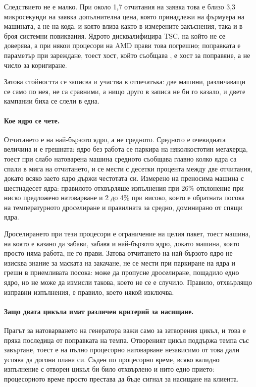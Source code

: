 Следствието не е малко. При около 1,7 отчитания на заявка това е близо 3,3 микросекунди на
заявка допълнителна цена, която принадлежи на фърмуера на машината, а не на кода, и която
влиза както в измерените закъснения, така и в броя системни повиквания. Ядрото дисквалифицира
TSC, на който не се доверява, а при някои процесори на AMD прави това погрешно; поправката е
параметър при зареждане, тоест хост, който съобщава , е хост за поправяне, а не
число за коригиране.

Затова стойността се записва и участва в отпечатъка: две машини, различаващи се само по нея,
не са сравними, а нищо друго в записа не би го казало, и двете кампании биха се слели в една.

\paragraph{Кое ядро се чете.} Отчитането е на най-бързото ядро, а не средното.
Средното е очевидната величина и е грешната: ядро без работа се паркира на няколкостотин
мегахерца, тоест при слабо натоварена машина средното съобщава главно колко ядра са спали в
мига на отчитането, и се мести с десетки процента между две отчитания, докато всяко заето
ядро държи честотата си. Измерено на преносима машина с шестнадесет ядра: правилото
отхвърляше изпълнения при 26\% отклонение при ниско предложено натоварване и 2 до 4\% при
високо, което е обратната посока на температурното дроселиране и правилната за средно,
доминирано от спящи ядра.

Дроселирането при тези процесори е ограничение на целия пакет, тоест машина, на която е
казано да забави, забавя и най-бързото ядро, докато машина, която просто няма работа, не го
прави. Затова отчитането на най-бързото ядро не изисква знание за маската на закачане, не
се мести при паркиране на ядра и греши в приемливата посока: може да пропусне дроселиране,
пощадило едно ядро, но не може да измисли такова, което не се е случило. Правило, отхвърлящо
изправни изпълнения, е правило, което някой изключва.

\paragraph{Защо двата цикъла имат различен критерий за насищане.} Прагът за натоварването на
генератора важи само за затворения цикъл, и това е пряка последица от поправката на темпа.
Отвореният цикъл поддържа темпа със завъртане, тоест е на пълно процесорно натоварване
независимо от това дали успява да догони плана си. Съден по процесорно време, всяко валидно
изпълнение с отворен цикъл би било отхвърлено и нито едно прието: процесорното време просто
престава да бъде сигнал за насищане на клиента.

